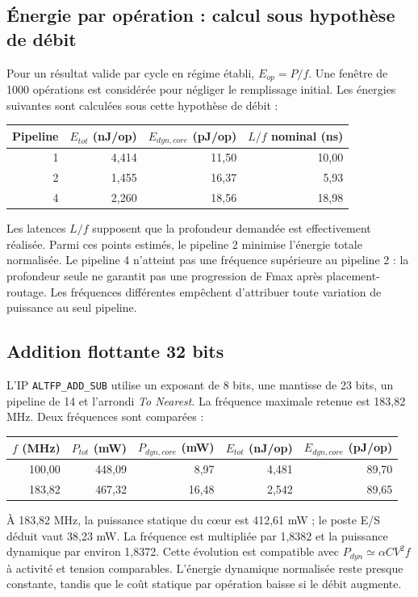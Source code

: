 \documentclass[11pt,a4paper]{article}
\begin{document}
\subsection{Énergie par opération : calcul sous hypothèse de débit}
Pour un résultat valide par cycle en régime établi, $E_{op}=P/f$. Une fenêtre de 1000 opérations est considérée pour négliger le remplissage initial. Les énergies suivantes sont calculées sous cette hypothèse de débit :
\begin{center}
\begin{tabular}{@{}rrrr@{}}
\toprule
Pipeline & $E_{tot}$ (nJ/op) & $E_{dyn,core}$ (pJ/op) & $L/f$ nominal (ns)\\
\midrule
1 & 4,414 & 11,50 & 10,00\\
2 & 1,455 & 16,37 & 5,93\\
4 & 2,260 & 18,56 & 18,98\\
\bottomrule
\end{tabular}
\end{center}
Les latences $L/f$ supposent que la profondeur demandée est effectivement réalisée. Parmi ces points estimés, le pipeline 2 minimise l'énergie totale normalisée. Le pipeline 4 n'atteint pas une fréquence supérieure au pipeline 2 : la profondeur seule ne garantit pas une progression de Fmax après placement-routage. Les fréquences différentes empêchent d'attribuer toute variation de puissance au seul pipeline.

\newpage
\subsection{Addition flottante 32 bits}
L'IP \texttt{ALTFP\_ADD\_SUB} utilise un exposant de 8 bits, une mantisse de 23 bits, un pipeline de 14 et l'arrondi \emph{To Nearest}. La fréquence maximale retenue est 183,82 MHz. Deux fréquences sont comparées :
\begin{center}
\begin{tabular}{@{}rrrrr@{}}
\toprule
$f$ (MHz) & $P_{tot}$ (mW) & $P_{dyn,core}$ (mW) & $E_{tot}$ (nJ/op) & $E_{dyn,core}$ (pJ/op)\\
\midrule
100,00 & 448,09 & 8,97 & 4,481 & 89,70\\
183,82 & 467,32 & 16,48 & 2,542 & 89,65\\
\bottomrule
\end{tabular}
\end{center}
À 183,82 MHz, la puissance statique du c\oe{}ur est 412,61 mW ; le poste E/S déduit vaut 38,23 mW. La fréquence est multipliée par 1,8382 et la puissance dynamique par environ 1,8372. Cette évolution est compatible avec $P_{dyn}\simeq\alpha CV^2f$ à activité et tension comparables. L'énergie dynamique normalisée reste presque constante, tandis que le coût statique par opération baisse si le débit augmente.
\end{document}
